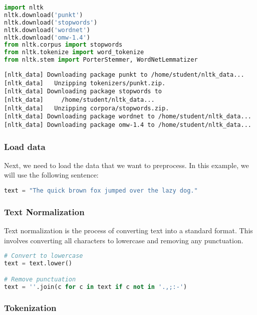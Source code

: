 \begin{lstlisting}[language=Python]
import nltk
nltk.download('punkt')
nltk.download('stopwords')
nltk.download('wordnet')
nltk.download('omw-1.4')
from nltk.corpus import stopwords
from nltk.tokenize import word_tokenize
from nltk.stem import PorterStemmer, WordNetLemmatizer
\end{lstlisting}

\begin{lstlisting}
[nltk_data] Downloading package punkt to /home/student/nltk_data...
[nltk_data]   Unzipping tokenizers/punkt.zip.
[nltk_data] Downloading package stopwords to
[nltk_data]     /home/student/nltk_data...
[nltk_data]   Unzipping corpora/stopwords.zip.
[nltk_data] Downloading package wordnet to /home/student/nltk_data...
[nltk_data] Downloading package omw-1.4 to /home/student/nltk_data...
\end{lstlisting}

\subsubsection{Load data}\label{load-data}

Next, we need to load the data that we want to preprocess. In this
example, we will use the following sentence:

\begin{lstlisting}[language=Python]
text = "The quick brown fox jumped over the lazy dog."
\end{lstlisting}

\subsubsection{Text Normalization}\label{text-normalization}

Text normalization is the process of converting text into a standard
format. This involves converting all characters to lowercase and
removing any punctuation.

\begin{lstlisting}[language=Python]
# Convert to lowercase
text = text.lower()

# Remove punctuation
text = ''.join(c for c in text if c not in '.,;:-')
\end{lstlisting}

\subsubsection{Tokenization}\label{tokenization}

